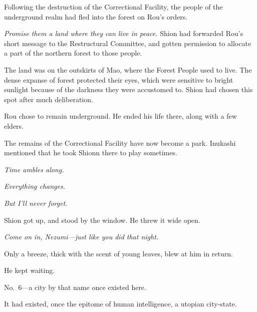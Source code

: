 
Following the destruction of the Correctional Facility, the people of
the underground realm had fled into the forest on Rou's orders.

\emph{Promise them a land where they can live in peace.} Shion had forwarded
Rou's short message to the Restructural Committee, and gotten permission
to allocate a part of the northern forest to those people.

The land was on the outskirts of Mao, where the Forest People used to
live. The dense expanse of forest protected their eyes, which were
sensitive to bright sunlight because of the darkness they were
accustomed to. Shion had chosen this spot after much deliberation.

Rou chose to remain underground. He ended his life there, along with a
few elders.

The remains of the Correctional Facility have now become a park.
Inukashi mentioned that he took Shionn there to play sometimes.

\emph{Time ambles along.}

\emph{Everything changes.}

\emph{But I'll never forget.}

Shion got up, and stood by the window. He threw it wide open.

\emph{Come on in, Nezumi---just like you did that night.}

Only a breeze, thick with the scent of young leaves, blew at him in
return.

He kept waiting.

\mybreak

No.~6---a city by that name once existed here.

It had existed, once the epitome of human intelligence, a utopian
city-state.